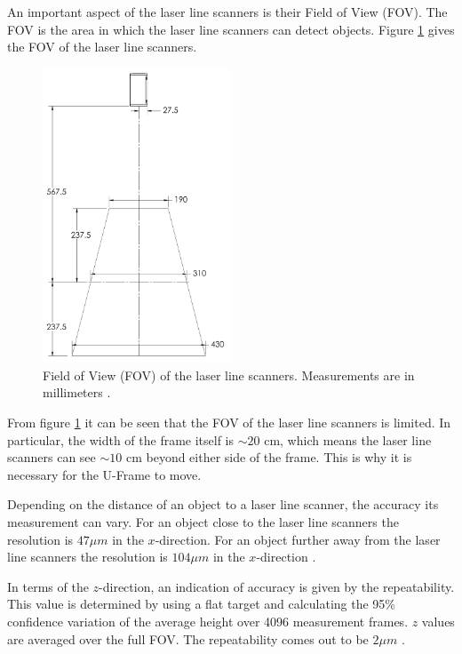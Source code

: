 An important aspect of the laser line scanners is their Field of View (FOV).
The FOV is the area in which the laser line scanners can detect objects. Figure \ref{fig:lls_fov} gives the FOV of the laser line scanners.
\begin{figure}[H]
    \centering
    \includegraphics[width=0.5\textwidth]{images/laser_line_scanner_fov.png}
    \caption{Field of View (FOV) of the laser line scanners. Measurements are in millimeters \cite{gocator2650FOV}.}
    \label{fig:lls_fov}
\end{figure}
From figure \ref{fig:lls_fov} it can be seen that the FOV of the laser line scanners is limited. In particular, the width of the frame itself is $\sim 20$ cm, which means the laser line scanners can see $\sim 10$ cm beyond either side of the frame. This is why it is necessary for the U-Frame to move.

Depending on the distance of an object to a laser line scanner, the accuracy its measurement can vary. For an object close to the laser line scanners the resolution is $47 \mu m$ in the $x$-direction. For an object further away from the laser line scanners the resolution is $104 \mu m$ in the $x$-direction \cite{gocator2650datasheet}.

In terms of the $z$-direction, an indication of accuracy is given by the repeatability. This value is determined by using a flat target and calculating the 95\% confidence variation of the average height over 4096 measurement frames. $z$ values are averaged over the full FOV. The repeatability comes out to be $2 \mu m$ \cite{gocator2650datasheet}.

